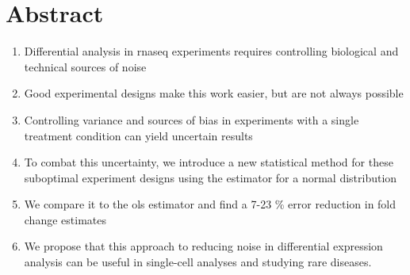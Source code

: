 \section{Abstract}

\begin{enumerate}
  \item Differential analysis in \gls{rnaseq} experiments requires controlling biological and technical sources of noise
  \item Good experimental designs make this work easier, but are not always possible
  \item Controlling variance and sources of bias in experiments with a single treatment condition can yield uncertain results
  \item To combat this uncertainty, we introduce a new statistical method for these suboptimal experiment designs using the  estimator for a normal distribution
  \item We compare it to the \gls{ols} estimator and find a 7-23 \% error reduction in fold change estimates
  \item We propose that this approach to reducing noise in differential expression analysis can be useful in single-cell analyses and studying rare diseases.
\end{enumerate}
